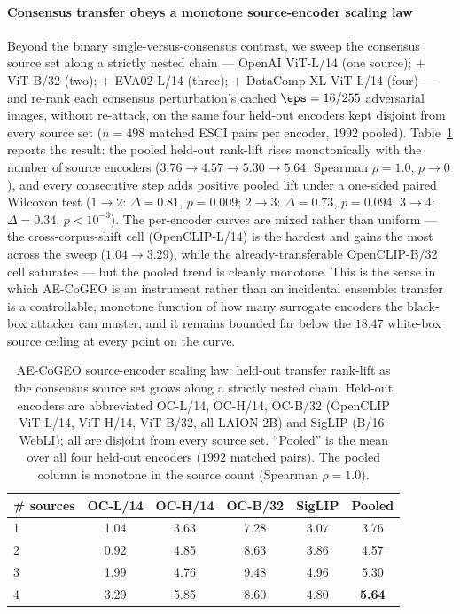 \paragraph{Consensus transfer obeys a monotone source-encoder scaling law} Beyond the binary single-versus-consensus contrast, we sweep the consensus source set along a strictly nested chain --- OpenAI ViT-L/14 (one source); $+$ ViT-B/32 (two); $+$ EVA02-L/14 (three); $+$ DataComp-XL ViT-L/14 (four) --- and re-rank each consensus perturbation's cached $\eps = 16/255$ adversarial images, without re-attack, on the same four held-out encoders kept disjoint from every source set ($n = 498$ matched ESCI pairs per encoder, $1992$ pooled). Table~\ref{sm:tab:scaling} reports the result: the pooled held-out rank-lift rises monotonically with the number of source encoders ($3.76 \to 4.57 \to 5.30 \to 5.64$; Spearman $\rho = 1.0$, $p \to 0$), and every consecutive step adds positive pooled lift under a one-sided paired Wilcoxon test ($1\!\to\!2$: $\Delta = 0.81$, $p = 0.009$; $2\!\to\!3$: $\Delta = 0.73$, $p = 0.094$; $3\!\to\!4$: $\Delta = 0.34$, $p < 10^{-3}$). The per-encoder curves are mixed rather than uniform --- the cross-corpus-shift cell (OpenCLIP-L/14) is the hardest and gains the most across the sweep ($1.04 \to 3.29$), while the already-transferable OpenCLIP-B/32 cell saturates --- but the pooled trend is cleanly monotone. This is the sense in which AE-CoGEO is an instrument rather than an incidental ensemble: transfer is a controllable, monotone function of how many surrogate encoders the black-box attacker can muster, and it remains bounded far below the $18.47$ white-box source ceiling at every point on the curve.

\begin{table}[t]
\centering
\footnotesize
\setlength{\tabcolsep}{4.5pt}
\caption{AE-CoGEO source-encoder scaling law: held-out transfer rank-lift as the consensus source set grows along a strictly nested chain. Held-out encoders are abbreviated OC-L/14, OC-H/14, OC-B/32 (OpenCLIP ViT-L/14, ViT-H/14, ViT-B/32, all LAION-2B) and SigLIP (B/16-WebLI); all are disjoint from every source set. ``Pooled'' is the mean over all four held-out encoders ($1992$ matched pairs). The pooled column is monotone in the source count (Spearman $\rho = 1.0$).}
\label{sm:tab:scaling}
\begin{tabular}{lccccc}
\toprule
\# sources & OC-L/14 & OC-H/14 & OC-B/32 & SigLIP & Pooled \\
\midrule
1 & 1.04 & 3.63 & 7.28 & 3.07 & 3.76 \\
2 & 0.92 & 4.85 & 8.63 & 3.86 & 4.57 \\
3 & 1.99 & 4.76 & 9.48 & 4.96 & 5.30 \\
4 & 3.29 & 5.85 & 8.60 & 4.80 & \textbf{5.64} \\
\bottomrule
\end{tabular}
\end{table}

